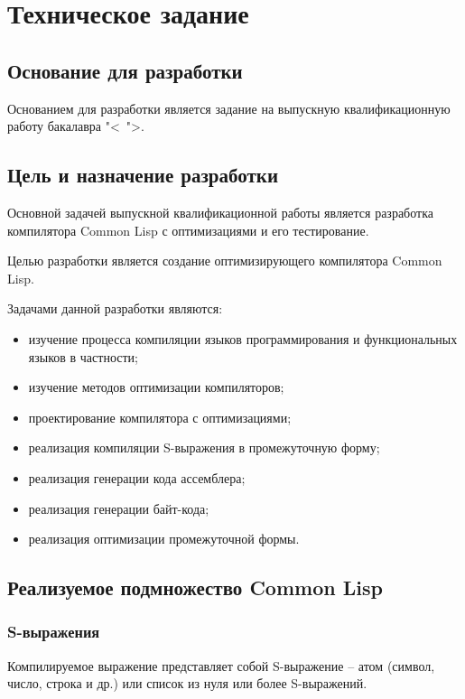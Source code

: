 \section{Техническое задание}
\subsection{Основание для разработки}

Основанием для разработки является задание на выпускную квалификационную работу бакалавра "<~">.

\subsection{Цель и назначение разработки}

Основной задачей выпускной квалификационной работы является разработка компилятора Common Lisp с оптимизациями и его тестирование.

Целью разработки является создание оптимизирующего компилятора Common Lisp.

Задачами данной разработки являются:
\begin{itemize}
\item изучение процесса компиляции языков программирования и функциональных языков в частности;
\item изучение методов оптимизации компиляторов;
\item проектирование компилятора с оптимизациями;
\item реализация компиляции S-выражения в промежуточную форму;
\item реализация генерации кода ассемблера;
\item реализация генерации байт-кода;
\item реализация оптимизации промежуточной формы.
\end{itemize}

\subsection{Реализуемое подмножество Common Lisp}

\subsubsection{S-выражения}

Компилируемое выражение представляет собой S-выражение -- атом (символ, число, строка и др.) или список из нуля или более S-выражений.

